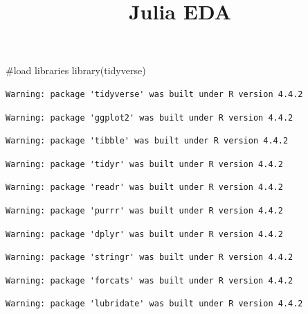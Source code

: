 \documentclass[
  letterpaper,
  DIV=11,
  numbers=noendperiod]{scrartcl}
\title{Julia EDA}
\author{}
\date{}
\newenvironment{Shaded}{\begin{snugshade}}{\end{snugshade}}
\newcommand{\CommentTok}[1]{\textcolor[rgb]{0.37,0.37,0.37}{#1}}
\newcommand{\FunctionTok}[1]{\textcolor[rgb]{0.28,0.35,0.67}{#1}}
\newcommand{\NormalTok}[1]{\textcolor[rgb]{0.00,0.23,0.31}{#1}}
\begin{document}
\maketitle


\begin{Shaded}
\begin{Highlighting}[]
\CommentTok{\#load libraries}
\FunctionTok{library}\NormalTok{(tidyverse)}
\end{Highlighting}
\end{Shaded}

\begin{verbatim}
Warning: package 'tidyverse' was built under R version 4.4.2
\end{verbatim}

\begin{verbatim}
Warning: package 'ggplot2' was built under R version 4.4.2
\end{verbatim}

\begin{verbatim}
Warning: package 'tibble' was built under R version 4.4.2
\end{verbatim}

\begin{verbatim}
Warning: package 'tidyr' was built under R version 4.4.2
\end{verbatim}

\begin{verbatim}
Warning: package 'readr' was built under R version 4.4.2
\end{verbatim}

\begin{verbatim}
Warning: package 'purrr' was built under R version 4.4.2
\end{verbatim}

\begin{verbatim}
Warning: package 'dplyr' was built under R version 4.4.2
\end{verbatim}

\begin{verbatim}
Warning: package 'stringr' was built under R version 4.4.2
\end{verbatim}

\begin{verbatim}
Warning: package 'forcats' was built under R version 4.4.2
\end{verbatim}

\begin{verbatim}
Warning: package 'lubridate' was built under R version 4.4.2
\end{verbatim}
\end{document}
